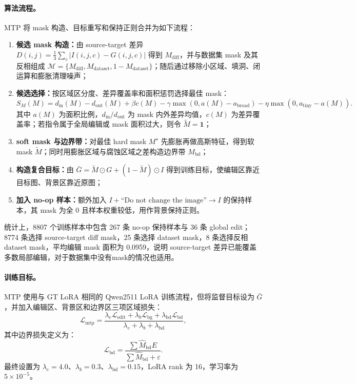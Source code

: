 \documentclass[UTF8,11pt,a4paper,fontset=fandol]{ctexart}
\begin{document}
\paragraph{算法流程。}
MTP 将 mask 构造、目标重写和保持正则合并为如下流程：
\begin{enumerate}
  \item \textbf{候选 mask 构造：}由 source-target 差异 $D(i,j)=\frac{1}{3}\sum_c|I(i,j,c)-G(i,j,c)|$ 得到 $M_{\mathrm{diff}}$，并与数据集 mask 及其反相组成 $\mathcal{M}=\{M_{\mathrm{diff}},M_{\mathrm{dataset}},1-M_{\mathrm{dataset}}\}$；随后通过移除小区域、填洞、闭运算和膨胀清理噪声；
  \item \textbf{候选选择：}按区域区分度、差异覆盖率和面积惩罚选择最佳 mask：
  \[
  S_M(M)=d_{\mathrm{in}}(M)-d_{\mathrm{out}}(M)+\beta c(M)
  -\gamma\max(0,a(M)-a_{\mathrm{broad}})
  -\eta\max(0,a_{\mathrm{tiny}}-a(M)).
  \]
  其中 $a(M)$ 为面积比例，$d_{\mathrm{in}}/d_{\mathrm{out}}$ 为 mask 内外差异均值，$c(M)$ 为差异覆盖率；若指令属于全局编辑或 mask 面积过大，则令 $\tilde M=\mathbf{1}$；
  \item \textbf{soft mask 与边界带：}对最佳 hard mask $M^\star$ 先膨胀再做高斯特征，得到软 mask $\tilde M$；同时用膨胀区域与腐蚀区域之差构造边界带 $M_{\mathrm{bd}}$；
  \item \textbf{构造复合目标：}由 $\bar G=\tilde M\odot G+(1-\tilde M)\odot I$ 得到训练目标，使编辑区靠近目标图、背景区靠近原图；
  \item \textbf{加入 no-op 样本：}额外加入 $I+\text{``Do not change the image''}\rightarrow I$ 的保持样本，其 mask 为全 0 且样本权重较低，用作背景保持正则。
\end{enumerate}
统计上，8807 个训练样本中包含 267 条 no-op 保持样本与 36 条 global edit；8774 条选择 source-target diff mask，25 条选择 dataset mask，8 条选择反相 dataset mask，平均编辑 mask 面积为 0.0959，说明 source-target 差异已能覆盖多数局部编辑，对于数据集中没有mask的情况也适用。

\paragraph{训练目标。}
MTP 使用与 GT LoRA 相同的 Qwen2511 LoRA 训练流程，但将监督目标设为 $\bar G$，并加入编辑区、背景区和边界区三项区域损失：
\[
\mathcal{L}_{\mathrm{mtp}}
=
\frac{
\lambda_e\mathcal{L}_{\mathrm{edit}}
+\lambda_b\mathcal{L}_{\mathrm{bg}}
+\lambda_{\mathrm{bd}}\mathcal{L}_{\mathrm{bd}}}
{\lambda_e+\lambda_b+\lambda_{\mathrm{bd}}},
\]
其中边界损失定义为：
\[
\mathcal{L}_{\mathrm{bd}}
=
\frac{\sum \hat M_{\mathrm{bd}}E}{\sum \hat M_{\mathrm{bd}}+\varepsilon}.
\]
最终设置为 $\lambda_e=4.0$、$\lambda_b=0.3$、$\lambda_{\mathrm{bd}}=0.15$，LoRA rank 为 16，学习率为 $5\times10^{-5}$。
\end{document}
